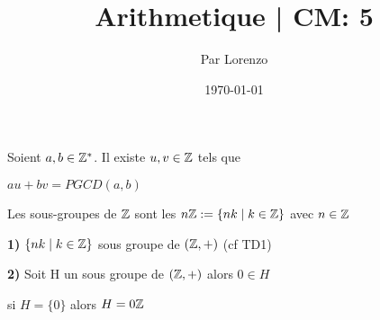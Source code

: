 \documentclass[a4paper, 12pt]{article}
\title{Arithmetique | CM: 5}
\author{Par Lorenzo}
\date{\today}
\begin{document}
\maketitle


\begin{proposition}
    Soient $a, b \in \mathbb{Z}^*$. Il existe $u, v \in \mathbb{Z}$ tels que

    $au + bv = PGCD(a, b)$
\end{proposition}


\begin{lemme}
    Les sous-groupes de $\mathbb{Z}$ sont les $n\mathbb{Z} := \{nk \mid k \in \mathbb{Z}\}$ avec $n \in \mathbb{Z}$
\end{lemme}

\begin{demonstration}
    \item \textbf{1)} $\{nk \mid k \in \mathbb{Z}\}$ sous groupe de $(\mathbb{Z}, +)$ (cf TD1)
    \item \textbf{2)} Soit H un sous groupe de $(\mathbb{Z}, +)$ alors $0 \in H$
    
    si $H = \{0\}$ alors $H = 0\mathbb{Z}$
\end{demonstration}

\end{document}
